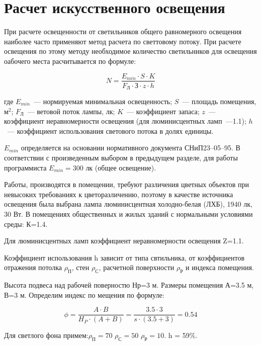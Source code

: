 \section{Расчет искусственного освещения}

При расчете освещенности от светильников общего равномерного освещения наиболее часто применяют метод расчета по светтовому потоку. При расчете освещения по этому методу необходимое количество светильников для освещения оабочего места расчитывается по формуле:

\begin{equation}
\label{f:lightsCount}
N = \frac{E_{min}\cdot S\cdot K}{F_\text{Л} \cdot \text{З} \cdot z \cdot h}
\end{equation}

где $E_{min}$~--- нормируемая минимальная освещенность; $S$~--- площадь помещения, $\text{м}^2$; $F_\text{Л}$~--- ветовой поток лампы, лк; $K$~--- коэффициент запаса; $z$~--- коэффициент неравномерности освещения (для люминисцентных ламп~---1.1); $h$~--- коэффициент использования светового потока в долях единицы.

$E_{min}$ определяется на основании нормативного документа СНиП23--05--95. В соответствии с произведенным выбором в предыдущем разделе, для работы программиста $E_{min}=300$ лк (общее освещение).

Работы, производятся в помещении, требуют различения цветных объектов при невысоких требованиях к цветоразличению, поэтому в качестве источника освещения была выбрана лампа люминисцентная холодно-белая (ЛХБ), 1940 лк, 30 Вт. В помещениях общественных и жилых зданий с нормальными условиями среды: К=1.4.

Для люминисцентных ламп коэффициент неравномерности освещения Z=1.1.

Коэффициент использования h зависит от типа свтильника, от коэффициентов отражения потолка $\rho_\text{П}$, стен $\rho_\text{С}$, расчетной поверхности $\rho_\text{Р}$ и индекса помещения.

Высота подвеса над рабочей поверностю Нр=3 м. Размеры помещения А=3.5 м, В=3 м. Определим индекс по мещения по формуле:

\begin{equation}
\phi = \frac{A \cdot B}{H_P \cdot (A + B)} = \frac{3.5 \cdot 3}{s \cdot (3.5 + 3)} = 0.54
\end{equation}

Для светлого фона примем:$\rho_\text{П} = 70$ $\rho_\text{С} = 50$ $\rho_\text{Р} = 10$. h = 59\%.

